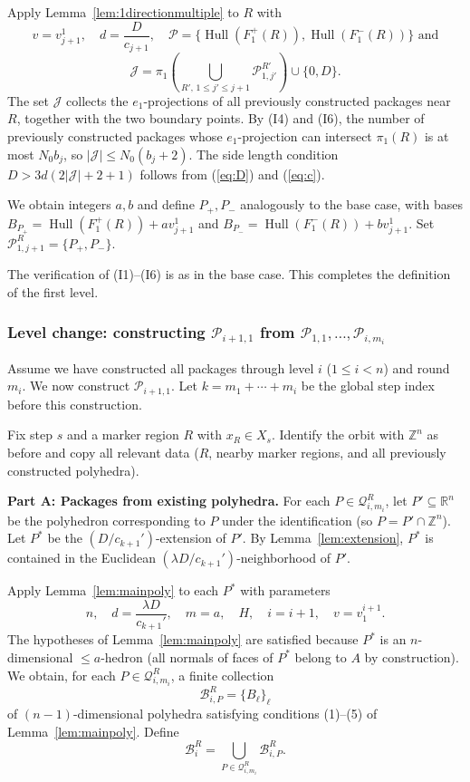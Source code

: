 \documentclass{amsart}
\theoremstyle{definition}
\DeclareMathOperator{\Hull}{Hull}
\begin{document}
Apply Lemma~\ref{lem:1directionmultiple} to $R$ with
\[
v=v_{j+1}^1,\quad d=\frac{D}{c_{j+1}},\quad
\mathcal{P}=\{\Hull(F_1^+(R)),\Hull(F_1^-(R))\} \text{ and}
\]
\[
\mathcal{J}=\pi_1\left (\bigcup_{R',\,1\leq j'\leq j+1}
\mathcal{P}_{1,j'}^{R'}\right )\cup\{0, D\}.
\]
The set $\mathcal{J}$ collects the $e_1$-projections of all previously
constructed packages near $R$, together with the two boundary points.
By (I4) and (I6), the number of previously constructed packages whose
$e_1$-projection can intersect $\pi_1(R)$ is at most $N_0 b_j$, so
$|\mathcal{J}|\leq N_0 (b_j+2)$. The side length condition
$D>3d(2|\mathcal{J}|+2+1)$ follows from (\ref{eq:D}) and (\ref{eq:c}).

We obtain integers $a,b$ and define $P_+, P_-$ analogously to the base
case, with bases $B_{P_+}=\Hull(F_1^+(R))+av_{j+1}^1$ and
$B_{P_-}=\Hull(F_1^-(R))+bv_{j+1}^1$. Set
$\mathcal{P}_{1,j+1}^R=\{P_+, P_-\}$.

The verification of (I1)--(I6) is as in the base case. This completes the definition of the first level.

\subsubsection{Level change: constructing $\mathcal{P}_{i+1,1}$ from
$\mathcal{P}_{1,1},\dots,\mathcal{P}_{i,m_i}$}

Assume we have constructed all packages through level $i$ ($1\leq i<n$)
and round $m_i$. We now construct $\mathcal{P}_{i+1,1}$. Let
$k=m_1+\cdots+m_i$ be the global step index before this construction.

Fix step $s$ and a marker region $R$ with $x_R\in X_s$. Identify the
orbit with $\mathbb{Z}^n$ as before and copy all relevant data ($R$,
nearby marker regions, and all previously constructed polyhedra).

\medskip\noindent
\textbf{Part A: Packages from existing polyhedra.}
For each $P\in\mathcal{Q}_{i,m_i}^R$, let $P'\subseteq\mathbb{R}^n$ be
the polyhedron corresponding to $P$ under the identification (so
$P=P'\cap\mathbb{Z}^n$). Let $P^*$ be the $(D/c_{k+1}')$-extension of
$P'$. By
Lemma~\ref{lem:extension}, $P^*$ is contained in the Euclidean
$(\lambda D/c_{k+1}')$-neighborhood of $P'$.

Apply Lemma~\ref{lem:mainpoly} to each $P^*$ with parameters
\[
n,\quad d=\frac{\lambda D}{c_{k+1}'},\quad m=a,\quad H,\quad
i=i+1,\quad v=v_1^{i+1}.
\]
The hypotheses of Lemma~\ref{lem:mainpoly} are satisfied because $P^*$
is an $n$-dimensional $\leq\!\! a$-hedron (all normals of faces of $P^*$ belong to $A$ by construction). We
obtain, for each $P\in\mathcal{Q}_{i,m_i}^R$, a finite collection
\[
\mathcal{B}_{i,P}^R=\{B_\ell\}_{\ell}
\]
of $(n-1)$-dimensional polyhedra satisfying conditions (1)--(5) of
Lemma~\ref{lem:mainpoly}. Define
\[
\mathcal{B}_{i}^R=\bigcup_{P\in\mathcal{Q}_{i,m_i}^R}
\mathcal{B}_{i,P}^R.
\]
\end{document}
